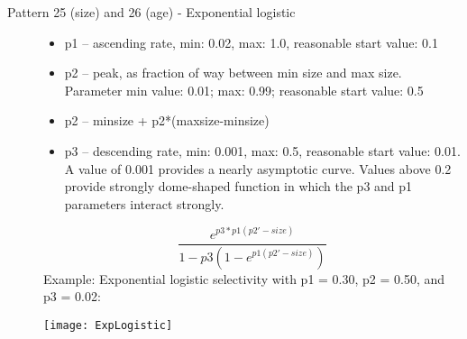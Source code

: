 \begin{description}
	\item[Pattern 25 (size) and 26 (age) - Exponential logistic]\hfil
	\begin{itemize}
		\item p1 – ascending rate, min: 0.02, max: 1.0, reasonable start value:  0.1
		\item p2 – peak, as fraction of way between min size and max size.  Parameter min value:  0.01; max:  0.99; reasonable start value:  0.5
		\item p2 – minsize + p2*(maxsize-minsize)
		\item p3 – descending rate, min: 0.001, max: 0.5, reasonable start value:  0.01.  A value of 0.001 provides a nearly asymptotic curve.  Values above 0.2 provide strongly dome-shaped function in which the p3 and p1 parameters interact strongly.
	\end{itemize}
	\begin{equation}
	\frac{e^{p3*p1(p2'-size)}}{1-p3(1-e^{p1(p2'-size)})}
	\end{equation}
	Example: Exponential logistic selectivity with p1 = 0.30, p2 = 0.50, and p3 = 0.02:\\
	\begin{center}
		\texttt{[image: ExpLogistic]}
	\end{center}
\end{description}

